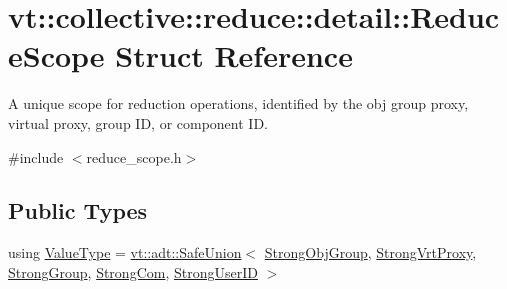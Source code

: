 \hypertarget{structvt_1_1collective_1_1reduce_1_1detail_1_1_reduce_scope}{}\section{vt\+:\+:collective\+:\+:reduce\+:\+:detail\+:\+:Reduce\+Scope Struct Reference}
\label{structvt_1_1collective_1_1reduce_1_1detail_1_1_reduce_scope}


A unique scope for reduction operations, identified by the obj group proxy, virtual proxy, group ID, or component ID.  




{\ttfamily \#include $<$reduce\+\_\+scope.\+h$>$}

\subsection*{Public Types}
\begin{DoxyCompactItemize}
\item 
using \hyperlink{structvt_1_1collective_1_1reduce_1_1detail_1_1_reduce_scope_a7abcfd8ab86f38734725fe77455e4838}{Value\+Type} = \hyperlink{namespacevt_1_1adt_ad2a7bbcb5f4735ae9d847f96ee62f144}{vt\+::adt\+::\+Safe\+Union}$<$ \hyperlink{namespacevt_1_1collective_1_1reduce_1_1detail_afd4940b3a4ac2ef740f0e3844a09dd08}{Strong\+Obj\+Group}, \hyperlink{namespacevt_1_1collective_1_1reduce_1_1detail_a492943cffff6d1a92386468d46f589df}{Strong\+Vrt\+Proxy}, \hyperlink{namespacevt_1_1collective_1_1reduce_1_1detail_adcad97800459415ff6ea4b5feb90e0f2}{Strong\+Group}, \hyperlink{namespacevt_1_1collective_1_1reduce_1_1detail_a6ea2d8e8f8ba226a6e704a9041aebaec}{Strong\+Com}, \hyperlink{namespacevt_1_1collective_1_1reduce_1_1detail_af9e42b20d1be7dccc1b5e587f0387e02}{Strong\+User\+ID} $>$
\end{DoxyCompactItemize}
